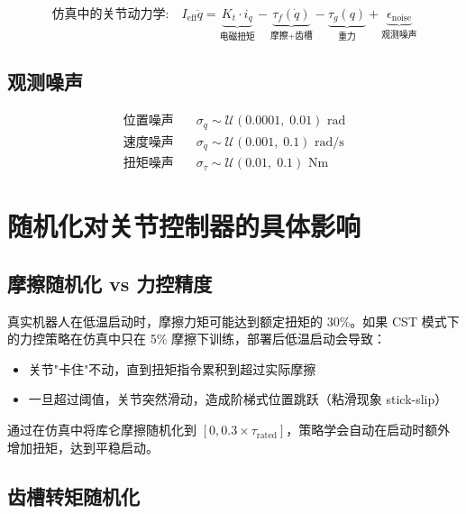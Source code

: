 \begin{equation}
\text{仿真中的关节动力学:}
\quad
I_{\text{eff}} \ddot{q} = \underbrace{K_t \cdot i_q}_{\text{电磁扭矩}} -
\underbrace{\tau_f(\dot{q})}_{\text{摩擦+齿槽}} -
\underbrace{\tau_g(q)}_{\text{重力}} +
\underbrace{\epsilon_{\text{noise}}}_{\text{观测噪声}}
\end{equation}

\subsection{观测噪声}

\begin{equation}
\begin{aligned}
\text{位置噪声} &\quad \sigma_q \sim \mathcal{U}(0.0001,\; 0.01) \text{ rad} \\
\text{速度噪声} &\quad \sigma_{\dot{q}} \sim \mathcal{U}(0.001,\; 0.1) \text{ rad/s} \\
\text{扭矩噪声} &\quad \sigma_{\tau} \sim \mathcal{U}(0.01,\; 0.1) \text{ Nm}
\end{aligned}
\end{equation}

\section{随机化对关节控制器的具体影响}

\subsection{摩擦随机化 vs 力控精度}

真实机器人在低温启动时，摩擦力矩可能达到额定扭矩的 30\%。如果 CST 模式下的力控策略在仿真中只在 5\% 摩擦下训练，部署后低温启动会导致：

\begin{itemize}
    \item 关节"卡住"不动，直到扭矩指令累积到超过实际摩擦
    \item 一旦超过阈值，关节突然滑动，造成阶梯式位置跳跃（粘滑现象 stick-slip）
\end{itemize}

通过在仿真中将库仑摩擦随机化到 \([0, 0.3 \times \tau_{\text{rated}}]\)，策略学会自动在启动时额外增加扭矩，达到平稳启动。

\subsection{齿槽转矩随机化}


